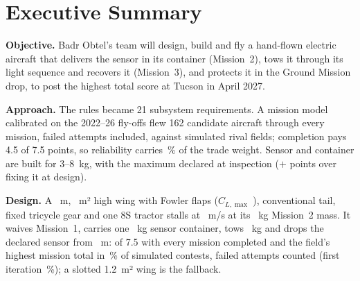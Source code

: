\section{Executive Summary}
\newcommand\gl[3]{\parbox[t]{0.163\linewidth}{\raggedright
  {\dbflabelfont\fontsize{7}{8.4}\selectfont\color{dbfFog}\MakeUppercase{#1}}\par\vspace{2pt}%
  {\dbftablefont\bfseries\fontsize{12.5}{14.5}\selectfont\color{white}#2}\hspace{0.2em}{\sffamily\fontsize{7.6}{9}\selectfont\color{dbfFog}#3}}}
\textbf{Objective.} Badr Obtel's team will design, build and fly a hand-flown electric aircraft that delivers the sensor in its container (Mission~2), tows it through its light sequence and recovers it (Mission~3), and protects it in the Ground Mission drop, to post the highest total score at Tucson in April 2027.

\textbf{Approach.} The rules became 21 subsystem requirements. A mission model calibrated on the 2022--26 fly-offs flew 162 candidate aircraft through every mission, failed attempts included, against simulated rival fields; completion pays 4.5 of 7.5 points, so reliability carries \tCompletion\,\% of the trade weight. Sensor and container are built for 3--8~kg, with the maximum declared at inspection ($+$\tDeclGain{} points over fixing it at design).

\textbf{Design.} A \nSpan~m, \nWingArea~m² high wing with Fowler flaps ($C_{L,\max}$ \nCLmaxLand), conventional tail, fixed tricycle gear and one 8S tractor stalls at \nStallMtwo~m/s at its \nGrossMtwo~kg Mission~2 mass. It waives Mission~1, carries one \nMtwoPayload~kg sensor container, tows \nMthreeMass~kg and drops the declared sensor from \nDrop~m: \sTotal{} of 7.5 with every mission completed and the field's highest mission total in \sPtopPct\,\% of simulated contests, failed attempts counted (first iteration \sPtopCtlPct\,\%); a slotted 1.2~m² wing is the fallback.

